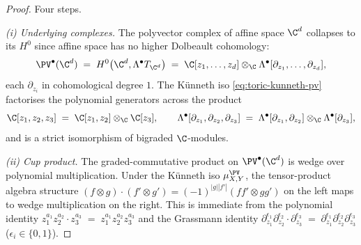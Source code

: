 \begin{proof}
Four steps.

\emph{(i) Underlying complexes.} The polyvector complex of affine space $\C^d$ collapses to its $H^0$ since affine space has no higher Dolbeault cohomology:
\[
 \PV^\bullet(\C^d) \;=\; H^0\bigl(\C^d, \Lambda^\bullet T_{\C^d}\bigr) \;=\; \C[z_1, \ldots, z_d] \otimes_\C \Lambda^\bullet[\partial_{z_1}, \ldots, \partial_{z_d}],
\]
each $\partial_{z_i}$ in cohomological degree $1$. The K\"unneth iso \eqref{eq:toric-kunneth-pv} factorises the polynomial generators across the product
\[
 \C[z_1, z_2, z_3] \;=\; \C[z_1, z_2] \otimes_\C \C[z_3], \qquad \Lambda^\bullet[\partial_{z_1}, \partial_{z_2}, \partial_{z_3}] \;=\; \Lambda^\bullet[\partial_{z_1}, \partial_{z_2}] \otimes_\C \Lambda^\bullet[\partial_{z_3}],
\]
and is a strict isomorphism of bigraded $\C$-modules.

\emph{(ii) Cup product.} The graded-commutative product on $\PV^\bullet(\C^d)$ is wedge over polynomial multiplication. Under the K\"unneth iso $\mu^{\PV}_{X,Y}$, the tensor-product algebra structure $(f \otimes g) \cdot (f' \otimes g') = (-1)^{|g||f'|}(ff' \otimes gg')$ on the left maps to wedge multiplication on the right. This is immediate from the polynomial identity $z_1^{a_1} z_2^{a_2} \cdot z_3^{a_3} \;=\; z_1^{a_1} z_2^{a_2} z_3^{a_3}$ and the Grassmann identity $\partial_{z_1}^{\epsilon_1} \partial_{z_2}^{\epsilon_2} \cdot \partial_{z_3}^{\epsilon_3} \;=\; \partial_{z_1}^{\epsilon_1} \partial_{z_2}^{\epsilon_2} \partial_{z_3}^{\epsilon_3}$ ($\epsilon_i \in \{0, 1\}$).


\end{proof}
